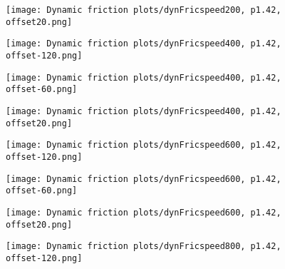 \documentclass[12pt]{article}
\begin{document}
\begin{figure}[!h]
    \centering
    \begin{minipage}{0.49\textwidth}       
         \texttt{[image: Dynamic friction plots/dynFricspeed200, p1.42, offset20.png]}
    \end{minipage}
    \begin{minipage}{0.49\textwidth}       
         \texttt{[image: Dynamic friction plots/dynFricspeed400, p1.42, offset-120.png]}
    \end{minipage}

\end{figure}

\begin{figure}[!h]
    \centering
    \begin{minipage}{0.49\textwidth}       
         \texttt{[image: Dynamic friction plots/dynFricspeed400, p1.42, offset-60.png]}
    \end{minipage}
    \begin{minipage}{0.49\textwidth}       
         \texttt{[image: Dynamic friction plots/dynFricspeed400, p1.42, offset20.png]}
    \end{minipage}

\end{figure}
\begin{figure}[!h]
    \centering
    \begin{minipage}{0.49\textwidth}       
         \texttt{[image: Dynamic friction plots/dynFricspeed600, p1.42, offset-120.png]}
    \end{minipage}
    \begin{minipage}{0.49\textwidth}       
         \texttt{[image: Dynamic friction plots/dynFricspeed600, p1.42, offset-60.png]}
    \end{minipage}

\end{figure}
\begin{figure}[!h]
    \centering
    \begin{minipage}{0.49\textwidth}       
         \texttt{[image: Dynamic friction plots/dynFricspeed600, p1.42, offset20.png]}
    \end{minipage}
    \begin{minipage}{0.49\textwidth}       
         \texttt{[image: Dynamic friction plots/dynFricspeed800, p1.42, offset-120.png]}
    \end{minipage}

\end{figure}
\end{document}
